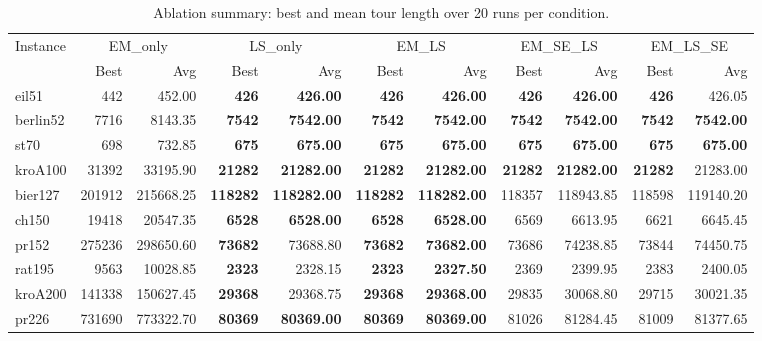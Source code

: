\begin{table}[tp]
  \centering
  \caption{Ablation summary: best and mean tour length over 20 runs per condition.}
  \label{tab:ablation-compact}
  \small
  \begin{tabular}{lrrrrrrrrrr}
    \toprule
    \multirow{2}{*}{Instance} & \multicolumn{2}{c}{EM\_only} & \multicolumn{2}{c}{LS\_only} & \multicolumn{2}{c}{EM\_LS} & \multicolumn{2}{c}{EM\_SE\_LS} & \multicolumn{2}{c}{EM\_LS\_SE} \\
    \cmidrule(lr){2-3}\cmidrule(lr){4-5}\cmidrule(lr){6-7}\cmidrule(lr){8-9}\cmidrule(lr){10-11}
     & Best & Avg & Best & Avg & Best & Avg & Best & Avg & Best & Avg \\
    \midrule
    eil51 & 442 & 452.00 & \textbf{426} & \textbf{426.00} & \textbf{426} & \textbf{426.00} & \textbf{426} & \textbf{426.00} & \textbf{426} & 426.05 \\
    berlin52 & 7716 & 8143.35 & \textbf{7542} & \textbf{7542.00} & \textbf{7542} & \textbf{7542.00} & \textbf{7542} & \textbf{7542.00} & \textbf{7542} & \textbf{7542.00} \\
    st70 & 698 & 732.85 & \textbf{675} & \textbf{675.00} & \textbf{675} & \textbf{675.00} & \textbf{675} & \textbf{675.00} & \textbf{675} & \textbf{675.00} \\
    kroA100 & 31392 & 33195.90 & \textbf{21282} & \textbf{21282.00} & \textbf{21282} & \textbf{21282.00} & \textbf{21282} & \textbf{21282.00} & \textbf{21282} & 21283.00 \\
    bier127 & 201912 & 215668.25 & \textbf{118282} & \textbf{118282.00} & \textbf{118282} & \textbf{118282.00} & 118357 & 118943.85 & 118598 & 119140.20 \\
    ch150 & 19418 & 20547.35 & \textbf{6528} & \textbf{6528.00} & \textbf{6528} & \textbf{6528.00} & 6569 & 6613.95 & 6621 & 6645.45 \\
    pr152 & 275236 & 298650.60 & \textbf{73682} & 73688.80 & \textbf{73682} & \textbf{73682.00} & 73686 & 74238.85 & 73844 & 74450.75 \\
    rat195 & 9563 & 10028.85 & \textbf{2323} & 2328.15 & \textbf{2323} & \textbf{2327.50} & 2369 & 2399.95 & 2383 & 2400.05 \\
    kroA200 & 141338 & 150627.45 & \textbf{29368} & 29368.75 & \textbf{29368} & \textbf{29368.00} & 29835 & 30068.80 & 29715 & 30021.35 \\
    pr226 & 731690 & 773322.70 & \textbf{80369} & \textbf{80369.00} & \textbf{80369} & \textbf{80369.00} & 81026 & 81284.45 & 81009 & 81377.65 \\

\end{tabular}
\end{table}
